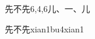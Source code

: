 \begin{entry}{先不先}{6,4,6}{⼉、⼀、⼉}
  \begin{phonetics}{先不先}{xian1bu4xian1}
  \end{phonetics}
\end{entry}
